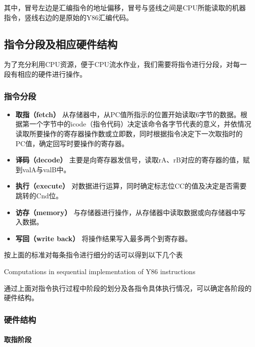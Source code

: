 其中，冒号左边是汇编指令的地址偏移，冒号与竖线之间是CPU所能读取的机器指令，竖线右边的是原始的Y86汇编代码。

\subsection{指令分段及相应硬件结构}\label{ux6307ux4ee4ux5206ux6bb5ux53caux76f8ux5e94ux786cux4ef6ux7ed3ux6784}

为了充分利用CPU资源，便于CPU流水作业，我们需要将指令进行分段，对每一段有相应的硬件进行操作。

\subsubsection{指令分段}\label{ux6307ux4ee4ux5206ux6bb5}

\begin{itemize}
\item
  \textbf{取指（fetch）}
  从存储器中，从PC值所指示的位置开始读取6字节的数据。根据第一个字节中的icode（指令代码）决定该命令各字节代表的意义，并依情况读取所要操作的寄存器操作数或立即数，同时根据指令决定下一次取指时的PC值，确定回写时要操作的寄存器。
\item
  \textbf{译码（decode）}
  主要是向寄存器发信号，读取rA、rB对应的寄存器的值，赋到valA与valB中。
\item
  \textbf{执行（execute）}
  对数据进行运算，同时确定标志位CC的值及决定是否需要跳转的Cnd位。
\item
  \textbf{访存（memory）}
  与存储器进行操作，从存储器中读取数据或向存储器中写入数据。
\item
  \textbf{写回（write back）} 将操作结果写入最多两个到寄存器。
\end{itemize}

按上面的标准对每条指令进行细分的话可以得到以下几个表

Computations in sequential implementation of Y86 instructions

通过上面对指令执行过程中阶段的划分及各指令具体执行情况，可以确定各阶段的硬件结构。

\subsubsection{硬件结构}\label{ux786cux4ef6ux7ed3ux6784}

\paragraph{取指阶段}\label{ux53d6ux6307ux9636ux6bb5}

